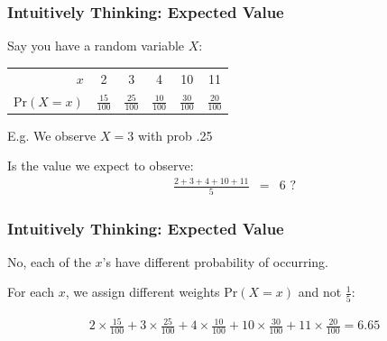 \documentclass[handout]{beamer}
\newcommand{\blue}[1]{\textcolor{blue2}{#1}}
\newcommand{\prob}{\mbox{Pr}}
\begin{document}
%
%
%
\begin{frame}
\frametitle{Intuitively Thinking: Expected Value}
Say you have a random variable $X$:
\begin{center}
\begin{tabular}{r|ccccc}
  \hline
$x$ & 2 & 3 & 4 & 10 & 11 \\ 
  $\prob(X=x)$ & $\frac{15}{100}$ & $\frac{25}{100}$ & $\frac{10}{100}$ & $\frac{30}{100}$ & $\frac{20}{100}$\\ 
   \hline
\end{tabular}
\end{center}

\vspace{0.5cm}

E.g. We observe $X=3$ with prob .25

\pause
\vspace{0.5cm}

Is the value we expect to observe: 
\begin{eqnarray*}
\frac{2 + 3 + 4 + 10 + 11}{5} &=& 6 \mbox{ ?}
\end{eqnarray*}

\end{frame}


\begin{frame}
\frametitle{Intuitively Thinking: Expected Value}
No, each of the $x$'s have different \blue{probability} of occurring.

\vspace{0.25cm}

\pause
For each $x$, we assign different \blue{weights} $\prob(X=x)$ and not $\frac{1}{5}$:

\begin{eqnarray*}
2 \times \frac{15}{100} + 3 \times \frac{25}{100} + 4 \times \frac{10}{100} + 10 \times \frac{30}{100} + 11 \times \frac{20}{100} = 6.65
\end{eqnarray*}

\end{frame}
\end{document}
